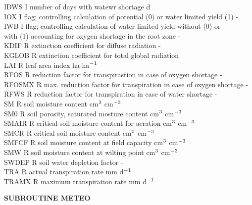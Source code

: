 \documentclass[11pt]{article}
\begin{document}
\begin{tabbing}
IDWS\> \> I\> number of days with watewr shortage\> \> \> \> \> \> \> d\\
IOX\> \> I\> flag; controlling calculation of potential (0) or water limited yield (1) \> \> \> \> \> \> \> -\\
IWB\> \> I\> flag; controlling calculation of water limited yield without (0) or \\
\>\> \> with (1) accounting for oxygen shortage in the root zone\> \> \> \> \> \> \> -\\
KDIF\> \> R\> extinction coefficient for diffuse radiation\> \> \> \> \> \> \> -\\
KGLOB\> \> R\> extinction coefficient for total global radiation\\
LAI\> \> R\> leaf area index\> \> \> \> \> \> \> ha ha$^{{\rm -1}}$\\
RFOS\> \> R\> reduction factor for transpirastion in case of oxygen shortage\> \> \> \> \> \> \> -\\
RFOSMX\> \> R\> max. reduction factor for transpiration in case of oxygen shortage\> \> \> \> \> \> \> -\\
RFWS\> \> R\> reduction factor for transpiration in case of water shortage\> \> \> \> \> \> \> -\\
SM\> \> R\> soil moisture content\> \> \> \> \> \> \> cm$^{{\rm 3}}$ cm$^{{\rm -3}}$\\
SM0\> \> R\> soil porosity, saturated mosture content \> \> \> \> \> \> \> cm$^{{\rm 3}}$ cm$^{{\rm -3}}$\\
SMAIR\> \> R\> critical soil moisture content for aeration\> \> \> \> \> \> \> cm$^{{\rm 3}}$ cm$^{{\rm -3}}$\\
SMCR\> \> R \> critical soil moisture content\> \> \> \> \> \> \> cm$^{{\rm 3}}$ cm$^{{\rm -3}}$\\
SMFCF\> \> R\> soil moisture content at field capacity\> \> \> \> \> \> \> cm$^{{\rm 3}}$ cm$^{{\rm -3}}$\\
SMW\> \> R \> soil moisture content at wilting point\> \> \> \> \> \> \> cm$^{{\rm 3}}$ cm$^{{\rm -3}}$\\
SWDEP\> \> R\> soil water depletion factor\> \> \> \> \> \> \> -\\
TRA\> \> R\> actual transpiration rate\> \> \> \> \> \> \> mm d$^{{\rm -1}}$\\
TRAMX\> \> R\> maximum transpiration rate\> \> \> \> \> \> \> mm d$^{{\rm -1}}$
\end{tabbing}

\bigskip
{\bf SUBROUTINE METEO}
\testlastline
\end{document}
